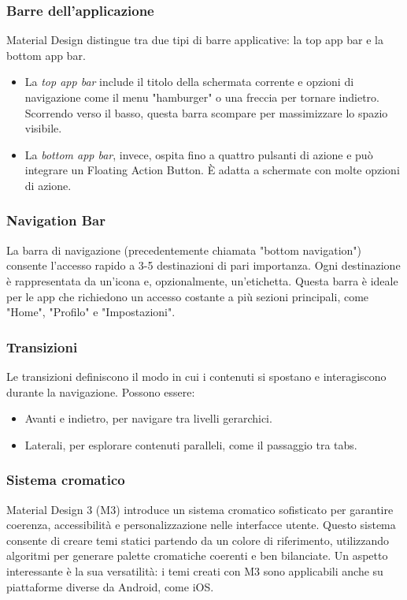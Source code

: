\subsubsection{Barre dell’applicazione}
Material Design distingue tra due tipi di barre applicative: la top app bar e la bottom app bar.
\begin{itemize}
    \item La \textit{top app bar} include il titolo della schermata corrente e opzioni di navigazione come il menu "hamburger" o una freccia per tornare indietro. Scorrendo verso il basso, questa barra scompare per massimizzare lo spazio visibile.
    \item La \textit{bottom app bar}, invece, ospita fino a quattro pulsanti di azione e può integrare un Floating Action Button. È adatta a schermate con molte opzioni di azione.
\end{itemize}

\subsubsection{Navigation Bar}
La barra di navigazione (precedentemente chiamata "bottom navigation") consente l'accesso rapido a 3-5 destinazioni di pari importanza. Ogni destinazione è rappresentata da un’icona e, opzionalmente, un’etichetta. Questa barra è ideale per le app che richiedono un accesso costante a più sezioni principali, come "Home", "Profilo" e "Impostazioni".

\subsubsection{Transizioni}
Le transizioni definiscono il modo in cui i contenuti si spostano e interagiscono durante la navigazione. Possono essere:
\begin{itemize}
    \item Avanti e indietro, per navigare tra livelli gerarchici.
    \item Laterali, per esplorare contenuti paralleli, come il passaggio tra tabs.
\end{itemize}

\subsubsection{Sistema cromatico}
Material Design 3 (M3) introduce un sistema cromatico sofisticato per garantire coerenza, accessibilità e personalizzazione nelle interfacce utente. Questo sistema consente di creare temi statici partendo da un colore di riferimento, utilizzando algoritmi per generare palette cromatiche coerenti e ben bilanciate. Un aspetto interessante è la sua versatilità: i temi creati con M3 sono applicabili anche su piattaforme diverse da Android, come iOS.

